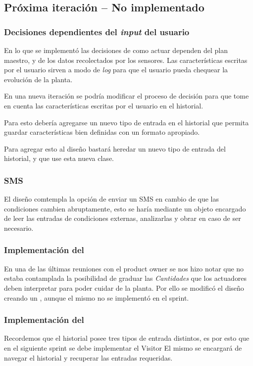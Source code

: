     \subsection{Pr\'oxima iteraci\'on -- No implementado}
      \subsubsection{Decisiones dependientes del \textit{input} del usuario}
        En lo que se implement\'o las decisiones de como actuar dependen del plan
        maestro, y de los datos recolectados por los sensores.
        Las caracter\'isticas escritas por el usuario sirven a modo de \textit{log}
        para que el usuario pueda chequear la evoluci\'on de la planta.

        En una nueva iteraci\'on se podr\'ia modificar el proceso de decisi\'on para
        que tome en cuenta las caracter\'isticas escritas por el usuario en el
        historial.

        Para esto deber\'ia agregarse un nuevo tipo de entrada en el historial
        que permita guardar caracter\'isticas bien definidas con un formato apropiado.

        Para agregar esto al dise\~no bastar\'a heredar un nuevo tipo de entrada
        del historial, y que \decisiones{} use esta nueva clase.

      \subsubsection{SMS}
        El dise\~no comtempla la opci\'on de enviar un SMS en cambio de que las
        condiciones cambien abruptamente, esto se har\'ia mediante un objeto encargado
        de leer las entradas de condiciones externas, analizarlas y obrar en caso de
        ser necesario.

      \subsubsection{Implementaci\'on del \calibrador{}}
        En una de las \'ultimas reuniones con el product owner se nos hizo notar que
        no estaba contamplada la posibilidad de graduar las \textit{Cantidades} que los 
        actuadores deben interpretar para poder cuidar de la planta. Por ello se 
        modific\'o el dise\~no creando un \calibrador{}, aunque el mismo no se 
        implement\'o en el sprint.
        
      \subsubsection{Implementaci\'on del \recopilador{}}
        Recordemos que el historial posee tres tipos de entrada distintos, es por
        esto que en el siguiente sprint se debe implementar el Visitor \recopilador{}
        El mismo se encargar\'a de navegar el historial y recuperar las entradas
        requeridas.

